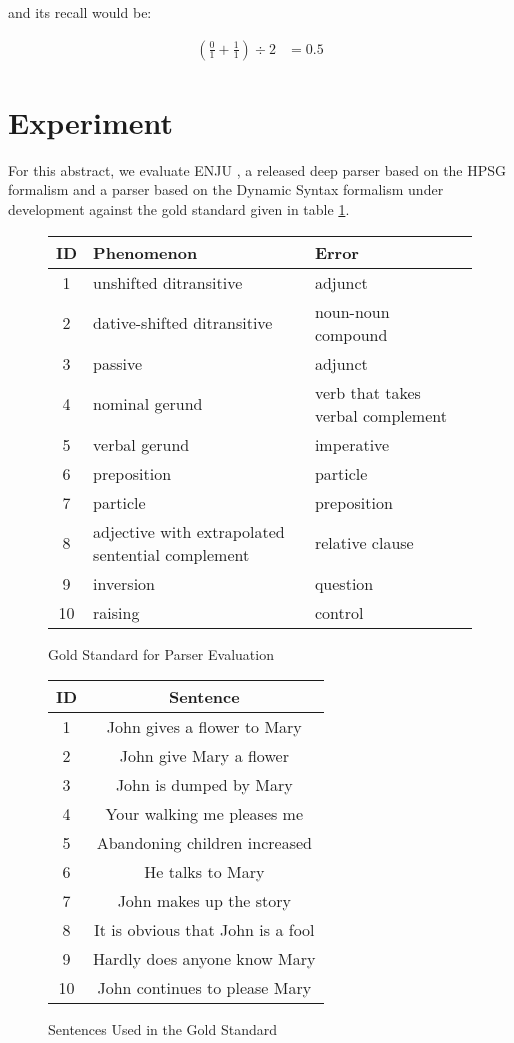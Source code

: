 \documentclass[11pt]{article}
\begin{document}
and its recall would be:

\begin{align*}
            (\frac{0}{1} + \frac{1}{1})\div 2 &= 0.5
\end{align*}

\section{Experiment}

For this abstract, we evaluate ENJU \cite{miyao2006}, a released deep parser based on the HPSG formalism and a parser based on the Dynamic Syntax formalism \cite{kempsonandmeyerviolandgabbay2001} under development against the gold standard given in table \ref{experiment}.
\begin{figure}
\begin{tabular}{| c | p{80pt} | p{80pt} |}
\hline
ID & Phenomenon & Error \\
\hline
\hline
1 &   unshifted ditransitive & adjunct \\
2 &   dative-shifted ditransitive & noun-noun compound \\
3 &   passive & adjunct \\
4 &  nominal gerund & verb that takes verbal complement \\
5 &  verbal gerund & imperative\\
6 &  preposition & particle \\
7 &  particle & preposition\\
8 & adjective with extrapolated sentential complement & relative clause\\
9 &  inversion & question \\
10 &  raising & control \\ 
\hline
\end{tabular}
\caption{Gold Standard for Parser Evaluation}\label{experiment}
\end{figure}

\begin{figure}
\begin{tabular}{| c | c |}
\hline
ID & Sentence \\
\hline
\hline
1 &  John gives a flower to Mary \\
2 &  John give Mary a flower \\
3 &  John is dumped by Mary \\
4 & Your walking me pleases me \\
5 &  Abandoning children increased\\
6 & He talks to Mary \\
7 &  John makes up the story \\
8 & It is obvious that John is a fool \\
9 &  Hardly does anyone know Mary\\
10 &  John continues to please Mary \\ 
\hline
\end{tabular}
\caption{Sentences Used in the Gold Standard}\label{sentences}
\end{figure}
\end{document}
